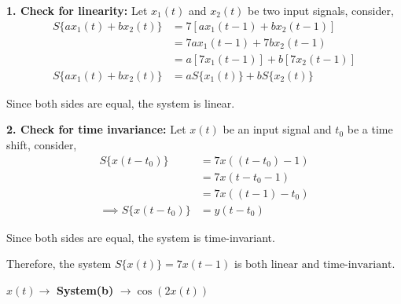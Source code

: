 \documentclass[a4paper, 10pt]{article}
\begin{document}
\begin{solution}
\vspace{2mm}

\par\noindent\textbf{1. Check for linearity:}
Let \( x_1(t) \) and \( x_2(t) \) be two input signals, consider,
\begin{align*}
S\{ a x_1(t) + b x_2(t) \} &= 7 [ a x_1(t-1) + b x_2(t-1) ] \\
&= 7 a x_1(t-1) + 7 b x_2(t-1) \\
&= a [ 7 x_1(t-1) ] + b [ 7 x_2(t-1) ] \\
S\{ a x_1(t) + b x_2(t) \} &= a S\{ x_1(t) \} + b S\{ x_2(t) \}
\end{align*}

Since both sides are equal, the system is linear.

\vspace{2mm}

\par\noindent\textbf{2. Check for time invariance:}
Let \( x(t) \) be an input signal and \( t_0 \) be a time shift, consider,
\begin{align*}
S\{ x(t - t_0) \} &= 7 x((t - t_0) - 1) \\
&= 7 x(t - t_0 - 1) \\
&= 7 x((t - 1) - t_0) \\
\implies S\{ x(t - t_0) \} &= y(t - t_0)
\end{align*}

Since both sides are equal, the system is time-invariant.

Therefore, the system \( S\{ x(t) \} = 7 x(t-1) \) is \( \boxed{\text{both linear and time-invariant}} \).
\end{solution}


\begin{subproblems}[start=2]
    \item \( x(t) \rightarrow \) \textbf{System(b)} \( \rightarrow \cos(2x(t)) \)
\end{subproblems}
\end{document}
